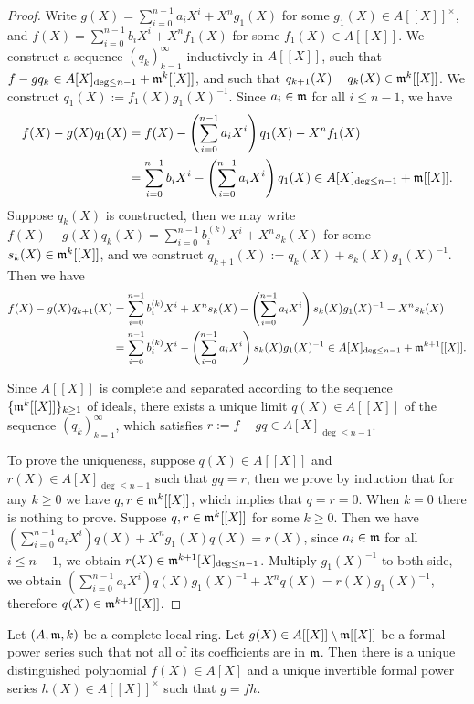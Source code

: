 \begin{proof}
Write $g(X)=\sum_{i=0}^{n-1}a_iX^i+X^ng_1(X)$ for some $g_1(X)\in A[[X]]^\times$, and
$f(X)=\sum_{i=0}^{n-1}b_iX^i+X^nf_1(X)$ for some $f_1(X)\in A[[X]]$.
We construct a sequence $(q_k)_{k=1}^\infty$ inductively in $A[[X]]$,
such that $f-gq_k\in A[X]_{\deg\leq n-1}+{\mathfrak{m}}^k[[X]]$,
and such that $q_{k+1}(X)-q_k(X)\in{\mathfrak{m}}^k[[X]]$.
We construct $q_1(X):=f_1(X)g_1(X)^{-1}$.
Since $a_i\in{\mathfrak{m}}$ for all $i\leq n-1$, we have
\begin{align*}
f(X)-g(X)q_1(X)&=f(X)-\left(\sum_{i=0}^{n-1}a_iX^i\right)q_1(X)
-X^nf_1(X) \\
&=\sum_{i=0}^{n-1}b_iX^i-\left(\sum_{i=0}^{n-1}a_iX^i\right)q_1(X)
\in A[X]_{\deg\leq n-1}+{\mathfrak{m}}[[X]].
\end{align*}
Suppose $q_k(X)$ is constructed, then we may write
$f(X)-g(X)q_k(X)=\sum_{i=0}^{n-1}b_i^{(k)}X^i+X^ns_k(X)$
for some $s_k(X)\in{\mathfrak{m}}^k[[X]]$, and we construct
$q_{k+1}(X):=q_k(X)+s_k(X)g_1(X)^{-1}$. Then we have
\begin{align*}
f(X)-g(X)q_{k+1}(X)&=\sum_{i=0}^{n-1}b_i^{(k)}X^i+X^ns_k(X)
-\left(\sum_{i=0}^{n-1}a_iX^i\right)s_k(X)g_1(X)^{-1}
-X^ns_k(X) \\
&=\sum_{i=0}^{n-1}b_i^{(k)}X^i-\left(\sum_{i=0}^{n-1}a_iX^i\right)s_k(X)g_1(X)^{-1}
\in A[X]_{\deg\leq n-1}+{\mathfrak{m}}^{k+1}[[X]].
\end{align*}

Since $A[[X]]$ is complete and separated according to the sequence
$\{{\mathfrak{m}}^k[[X]]\}_{k\geq 1}$ of ideals, there exists a unique limit $q(X)\in A[[X]]$
of the sequence $(q_k)_{k=1}^\infty$, which satisfies $r:=f-gq\in A[X]_{\deg\leq n-1}$.

To prove the uniqueness, suppose $q(X)\in A[[X]]$ and $r(X)\in A[X]_{\deg\leq n-1}$
such that $gq=r$, then we prove by induction that for any $k\geq 0$
we have $q,r\in{\mathfrak{m}}^k[[X]]$, which implies that $q=r=0$.
When $k=0$ there is nothing to prove. Suppose $q,r\in{\mathfrak{m}}^k[[X]]$ for some $k\geq 0$.
Then we have $(\sum_{i=0}^{n-1}a_iX^i)q(X)+X^ng_1(X)q(X)=r(X)$,
since $a_i\in{\mathfrak{m}}$ for all $i\leq n-1$, we obtain $r(X)\in{\mathfrak{m}}^{k+1}[X]_{\deg\leq n-1}$.
Multiply $g_1(X)^{-1}$ to both side,
we obtain $(\sum_{i=0}^{n-1}a_iX^i)q(X)g_1(X)^{-1}+X^nq(X)=r(X)g_1(X)^{-1}$,
therefore $q(X)\in{\mathfrak{m}}^{k+1}[[X]]$.
\end{proof}

\begin{prop}
\label{weierstrass-preparation}
\leanok
Let $(A,{\mathfrak{m}},k)$ be a complete local ring.
Let $g(X)\in A[[X]]\setminus{\mathfrak{m}}[[X]]$ be a formal power series
such that not all of its coefficients are in ${\mathfrak{m}}$.
Then there is a unique distinguished polynomial $f(X)\in A[X]$
and a unique invertible formal power series $h(X)\in A[[X]]^\times$ such that $g=fh$.
\end{prop}

